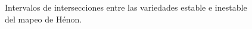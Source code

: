 \begin{figure}[htbp]
\vspace{0mm}
\caption{Intervalos de intersecciones entre las variedades estable e inestable del mapeo de Hénon.} \label{matriz_cortes}
\end{figure}

















